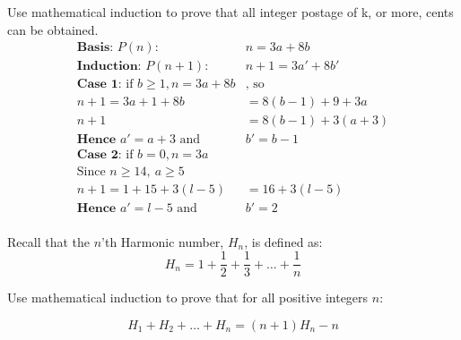 \documentclass[landscape, letterpaper, 8pt]{extarticle}
\begin{document}
\begin{multicols}{3}
\begin{example}
        Use mathematical induction to prove that all integer postage of k, or more, cents can be
        obtained.
        \begin{equation*}
            \begin{aligned}
                \textbf{Basis: } P(n):                             & n = 3a + 8b       \\
                \textbf{Induction: } P(n+1):                       & n+1 = 3a' + 8b'   \\
                \textbf{Case 1: } \text{if } b \geq 1, n = 3a + 8b & \text{, so}       \\
                n+1 = 3a+1+8b                                      & = 8(b-1) + 9 + 3a \\
                n+1                                                & = 8(b-1) +3(a+3)  \\
                \textbf{Hence }a' = a+3      \text{ and }          & b' = b - 1        \\
                \textbf{Case 2: } \text{if } b = 0, n = 3a         &                   \\
                \text{Since }n \geq 14,~a \geq 5                                       \\
                n+1 = 1 + 15 + 3(l-5)                              & = 16+ 3(l-5)      \\
                \textbf{Hence }a' = l-5      \text{ and }          & b' = 2            \\
            \end{aligned}
        \end{equation*}
    \end{example}
    \begin{example}
        Recall that the $n$'th Harmonic number, $H_n$, is defined as:
        $$
            H_n = 1+ \frac{1}{2} + \frac{1}{3} + \ldots + \frac{1}{n}
        $$

        Use mathematical induction to prove that for all positive integers $n$:

        $$
            H_1 + H_2 + \ldots + H_n = (n+1)H_n -n
        $$


\end{example}
\end{multicols}
\end{document}
